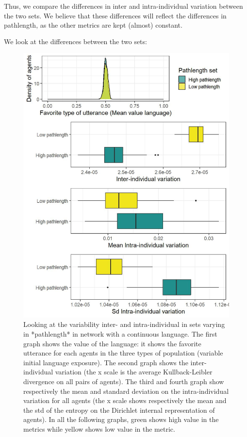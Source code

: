 \documentclass[
]{article}
\begin{document}
Thus, we compare the differences in inter and intra-individual variation
between the two sets. We believe that these differences will reflect the
differences in pathlength, as the other metrics are kept (almost)
constant.

We look at the differences between the two sets:

\begin{figure}[!H]

{\centering \includegraphics{./Figures/unnamed-chunk-40-1} 

}

\caption{Looking at the variability inter- and intra-individual in sets varying in *pathlength* in network with a continuous language. The first graph shows the value of the language: it shows the favorite utterance for each agents in the three types of population (variable initial language exposure). The second graph shows the  inter-individual variation (the x scale is the average Kullback-Leibler divergence on all pairs of agents). The third and fourth graph show respectively the mean and standard deviation on the intra-individual variation for all agents (the x scale shows respectively the mean and the std of the entropy on the Dirichlet internal representation of agents). In all the following graphs, green shows high value in the metrics while yellow shows low value in the metric.}\label{fig:unnamed-chunk-40}
\end{figure}
\end{document}
